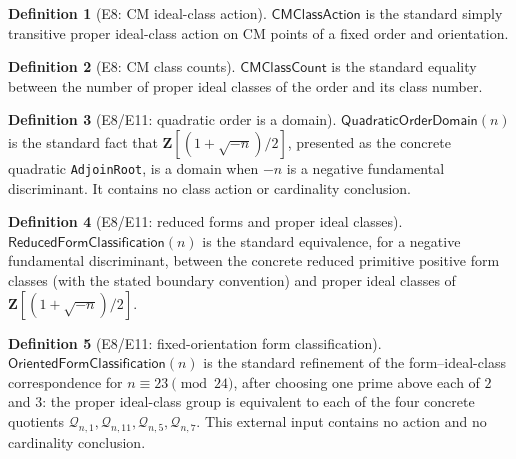 \documentclass[11pt,a4paper]{article}
\numberwithin{equation}{section}
\theoremstyle{plain}\newtheorem{theorem}{Theorem}[section]\newaliascnt{proposition}{theorem}\newtheorem{proposition}[proposition]{Proposition}\aliascntresetthe{proposition}\newaliascnt{lemma}{theorem}\newtheorem{lemma}[lemma]{Lemma}\aliascntresetthe{lemma}
\theoremstyle{definition}\newaliascnt{definition}{theorem}\newtheorem{definition}[definition]{Definition}\aliascntresetthe{definition}\newaliascnt{notation}{theorem}\newtheorem{notation}[notation]{Notation}\aliascntresetthe{notation}
\providecommand{\lean}[1]{}\providecommand{\leanok}{}
\begin{document}
\begin{definition}[E8: CM ideal-class action]\label{def_ext_cm}\lean{SptCM.RolenLiterature.CMClassAction}\leanok
$\mathsf{CMClassAction}$ is the standard simply transitive proper ideal-class action on CM points of a fixed order and orientation.
\end{definition}
\begin{definition}[E8: CM class counts]\label{def_ext_cm_class_count}\lean{SptCM.RolenLiterature.CMClassCount}\leanok
$\mathsf{CMClassCount}$ is the standard equality between the number of proper ideal classes of the order and its class number.
\end{definition}
\begin{definition}[E8/E11: quadratic order is a domain]\label{def_ext_quadratic_order_domain}\lean{SptCM.RolenLiterature.E8NegativeQuadraticOrderDomain}\leanok
$\mathsf{QuadraticOrderDomain}(n)$ is the standard fact that
$\mathbf Z[(1+\sqrt{-n})/2]$, presented as the concrete quadratic
\texttt{AdjoinRoot}, is a domain when $-n$ is a negative fundamental
discriminant.  It contains no class action or cardinality conclusion.
\end{definition}
\begin{definition}[E8/E11: reduced forms and proper ideal classes]\label{def_ext_reduced_form_classification}\lean{SptCM.RolenLiterature.E8ReducedFormClassification}\leanok
$\mathsf{ReducedFormClassification}(n)$ is the standard equivalence, for a
negative fundamental discriminant, between the concrete reduced primitive
positive form classes (with the stated boundary convention) and proper ideal
classes of $\mathbf Z[(1+\sqrt{-n})/2]$.
\end{definition}
\begin{definition}[E8/E11: fixed-orientation form classification]\label{def_ext_oriented_form_classification}\lean{SptCM.RolenLiterature.E8FourOrientedFormClassification}\leanok
$\mathsf{OrientedFormClassification}(n)$ is the standard refinement of the
form--ideal-class correspondence for $n\equiv23\pmod{24}$, after choosing
one prime above each of $2$ and $3$: the proper ideal-class group is equivalent to each of the four
concrete quotients $\mathcal Q_{n,1},\mathcal Q_{n,11},
\mathcal Q_{n,5},\mathcal Q_{n,7}$.  This external input contains no action
and no cardinality conclusion.
\end{definition}
\end{document}
